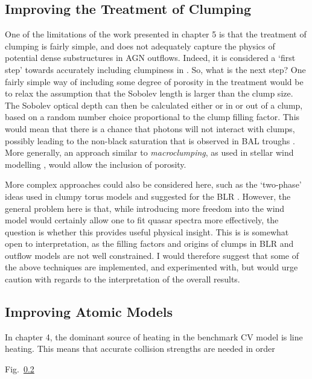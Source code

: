 \subsection{Improving the Treatment of Clumping}

One of the limitations of the work presented in chapter 5 is that the
treatment of clumping is fairly simple, and does not adequately capture the
physics of potential dense substructures in AGN outflows. 
Indeed, it is considered a `first step' towards
accurately including clumpiness in \py. So, what is the next step? One fairly 
simple way of including some degree of porosity in the treatment would 
be to relax the assumption that the Sobolev length is larger than the
clump size. The Sobolev optical depth can then be calculated either
or in or out of a clump, based on a random number choice proportional
to the clump filling factor. This would mean that there is a chance 
that photons will not interact with clumps, possibly leading to
the non-black saturation that is observed in BAL troughs 
\citep[][see also section~\ref{sec:balqso_angles}]{arav1999b,arav1999a}.
More generally, an approach similar to {\em macroclumping}, as 
used in stellar wind modelling \citep[e.g.][]{hamann2008,surlan2012},
would allow the inclusion of porosity.

More complex approaches could also be considered here, 
such as the `two-phase' ideas used in clumpy torus models 
\citep{stalevski2013} and suggested for the BLR 
\citep[e.g.][]{netzer1990, dekool1995, elvis2000}.
However, the general problem here is that, while introducing more freedom into 
the wind model would certainly allow one to fit quasar spectra
more effectively, the question is whether this provides useful physical insight.
This is is somewhat open to interpretation, as the filling factors and origins of clumps
in BLR and outflow models are not well constrained. I would therefore suggest that
some of the above techniques are implemented, and experimented with,
but would urge caution with regards to the interpretation of the overall
results.

\subsection{Improving Atomic Models}

In chapter 4, the dominant source of heating in the benchmark CV model
is line heating. This means that accurate collision strengths are needed
in order 


Fig.~\ref{}

